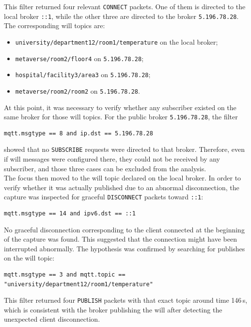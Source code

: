 \documentclass[a4paper,11pt]{article}
\begin{document}
This filter returned four relevant \texttt{CONNECT} packets. One of them is directed
to the local broker \texttt{::1}, while the other three are directed to the broker
\texttt{5.196.78.28}. The corresponding will topics are:
\begin{itemize}
    \item \texttt{university/department12/room1/temperature} on the local broker;
    \item \texttt{metaverse/room2/floor4} on \texttt{5.196.78.28};
    \item \texttt{hospital/facility3/area3} on \texttt{5.196.78.28};
    \item \texttt{metaverse/room2/room2} on \texttt{5.196.78.28}.
\end{itemize}

At this point, it was necessary to verify whether any subscriber existed on the same
broker for those will topics. For the public broker \texttt{5.196.78.28}, the filter

\begin{lstlisting}
mqtt.msgtype == 8 and ip.dst == 5.196.78.28
\end{lstlisting}

showed that no \texttt{SUBSCRIBE} requests were directed to that broker. Therefore,
even if will messages were configured there, they could not be received by any
subscriber, and those three cases can be excluded from the analysis.\\

The focus then moved to the will topic declared on the local broker. In order to
verify whether it was actually published due to an abnormal disconnection, the capture
was inspected for graceful \texttt{DISCONNECT} packets toward \texttt{::1}:

\begin{lstlisting}
mqtt.msgtype == 14 and ipv6.dst == ::1
\end{lstlisting}

No graceful disconnection corresponding to the client connected at the beginning of
the capture was found. This suggested that the connection might have been interrupted
abnormally. The hypothesis was confirmed by searching for publishes on the will topic:

\begin{lstlisting}
mqtt.msgtype == 3 and mqtt.topic == "university/department12/room1/temperature"
\end{lstlisting}

This filter returned four \texttt{PUBLISH} packets with that exact topic around
time 146\,s, which is consistent with the broker publishing the will after detecting
the unexpected client disconnection.\\
\end{document}
